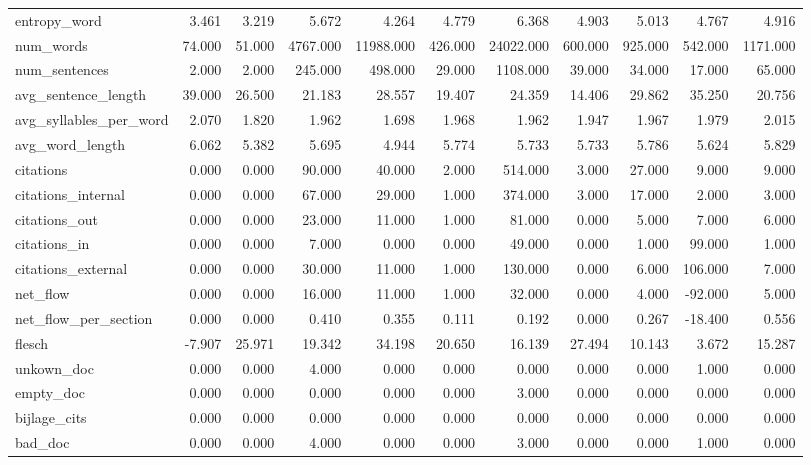 \begin{tabular}{lrrrrrrrrrr}
\cline{1-11}
entropy\_word & 3.461 & 3.219 & 5.672 & 4.264 & 4.779 & 6.368 & 4.903 & 5.013 & 4.767 & 4.916 \\
\cline{1-11}
num\_words & 74.000 & 51.000 & 4767.000 & 11988.000 & 426.000 & 24022.000 & 600.000 & 925.000 & 542.000 & 1171.000 \\
\cline{1-11}
num\_sentences & 2.000 & 2.000 & 245.000 & 498.000 & 29.000 & 1108.000 & 39.000 & 34.000 & 17.000 & 65.000 \\
\cline{1-11}
avg\_sentence\_length & 39.000 & 26.500 & 21.183 & 28.557 & 19.407 & 24.359 & 14.406 & 29.862 & 35.250 & 20.756 \\
\cline{1-11}
avg\_syllables\_per\_word & 2.070 & 1.820 & 1.962 & 1.698 & 1.968 & 1.962 & 1.947 & 1.967 & 1.979 & 2.015 \\
\cline{1-11}
avg\_word\_length & 6.062 & 5.382 & 5.695 & 4.944 & 5.774 & 5.733 & 5.733 & 5.786 & 5.624 & 5.829 \\
\cline{1-11}
citations & 0.000 & 0.000 & 90.000 & 40.000 & 2.000 & 514.000 & 3.000 & 27.000 & 9.000 & 9.000 \\
\cline{1-11}
citations\_internal & 0.000 & 0.000 & 67.000 & 29.000 & 1.000 & 374.000 & 3.000 & 17.000 & 2.000 & 3.000 \\
\cline{1-11}
citations\_out & 0.000 & 0.000 & 23.000 & 11.000 & 1.000 & 81.000 & 0.000 & 5.000 & 7.000 & 6.000 \\
\cline{1-11}
citations\_in & 0.000 & 0.000 & 7.000 & 0.000 & 0.000 & 49.000 & 0.000 & 1.000 & 99.000 & 1.000 \\
\cline{1-11}
citations\_external & 0.000 & 0.000 & 30.000 & 11.000 & 1.000 & 130.000 & 0.000 & 6.000 & 106.000 & 7.000 \\
\cline{1-11}
net\_flow & 0.000 & 0.000 & 16.000 & 11.000 & 1.000 & 32.000 & 0.000 & 4.000 & -92.000 & 5.000 \\
\cline{1-11}
net\_flow\_per\_section & 0.000 & 0.000 & 0.410 & 0.355 & 0.111 & 0.192 & 0.000 & 0.267 & -18.400 & 0.556 \\
\cline{1-11}
flesch & -7.907 & 25.971 & 19.342 & 34.198 & 20.650 & 16.139 & 27.494 & 10.143 & 3.672 & 15.287 \\
\cline{1-11}
unkown\_doc & 0.000 & 0.000 & 4.000 & 0.000 & 0.000 & 0.000 & 0.000 & 0.000 & 1.000 & 0.000 \\
\cline{1-11}
empty\_doc & 0.000 & 0.000 & 0.000 & 0.000 & 0.000 & 3.000 & 0.000 & 0.000 & 0.000 & 0.000 \\
\cline{1-11}
bijlage\_cits & 0.000 & 0.000 & 0.000 & 0.000 & 0.000 & 0.000 & 0.000 & 0.000 & 0.000 & 0.000 \\
\cline{1-11}
bad\_doc & 0.000 & 0.000 & 4.000 & 0.000 & 0.000 & 3.000 & 0.000 & 0.000 & 1.000 & 0.000 \\
\cline{1-11}
\bottomrule
\end{tabular}
